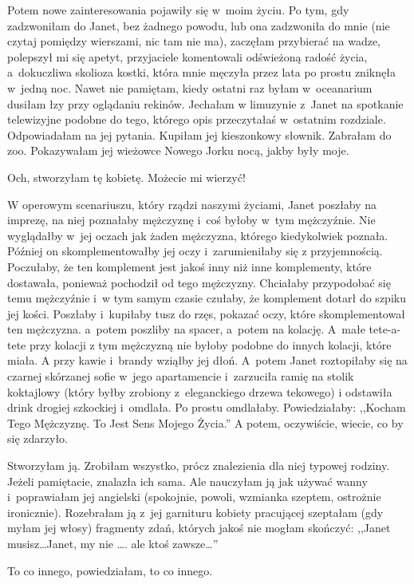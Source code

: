 \documentclass[oneside,polish,12pt,sfheadings]{mwbk}
\begin{document}
Potem nowe zainteresowania pojawiły się w~moim życiu. Po tym, gdy
zadzwoniłam do Janet, bez żadnego powodu, lub ona zadzwoniła do mnie
(nie czytaj pomiędzy wierszami, nic tam nie ma), zaczęłam przybierać
na wadze, polepszył mi się apetyt, przyjaciele komentowali odświeżoną
radość życia, a~dokuczliwa skolioza kostki, która mnie męczyła przez
lata po prostu zniknęła w~jedną noc. Nawet nie pamiętam, kiedy ostatni
raz byłam w~oceanarium dusiłam łzy przy oglądaniu rekinów. Jechałam
w limuzynie z~Janet na spotkanie telewizyjne podobne do tego, którego
opis przeczytałaś w~ostatnim rozdziale. Odpowiadałam na jej pytania.
Kupiłam jej kieszonkowy słownik. Zabrałam do zoo. Pokazywałam jej
wieżowce Nowego Jorku nocą, jakby były moje.

Och, stworzyłam tę kobietę. Możecie mi wierzyć!

W operowym scenariuszu, który rządzi naszymi życiami, Janet poszłaby
na imprezę, na niej poznałaby mężczyznę i~coś byłoby w~tym mężczyźnie.
Nie wyglądałby w~jej oczach jak żaden mężczyzna, którego kiedykolwiek
poznała. Później on skomplementowałby jej oczy i~zarumieniłaby się
z przyjemnością. Poczułaby, że ten komplement jest jakoś inny niż
inne komplementy, które dostawała, ponieważ pochodził od tego mężczyzny.
Chciałaby przypodobać się temu mężczyźnie i~w tym samym czasie czułaby,
że komplement dotarł do szpiku jej kości. Poszłaby i~kupiłaby tusz
do rzęs, pokazać oczy, które skomplementował ten mężczyzna. a~potem
poszliby na spacer, a~potem na kolację. A~małe tete-a-tete przy kolacji
z tym mężczyzną nie byłoby podobne do innych kolacji, które miała.
A przy kawie i~brandy wziąłby jej dłoń. A~potem Janet roztopiłaby
się na czarnej skórzanej sofie w~jego apartamencie i~zarzuciła ramię
na stolik koktajlowy (który byłby zrobiony z~eleganckiego drzewa tekowego)
i odstawiła drink drogiej szkockiej i~omdlała. Po prostu omdlałaby.
Powiedziałaby: ,,Kocham Tego Mężczyznę. To Jest Sens Mojego Życia.''
A potem, oczywiście, wiecie, co by się zdarzyło.

Stworzyłam ją. Zrobiłam wszystko, prócz znalezienia dla niej typowej
rodziny. Jeżeli pamiętacie, znalazła ich sama. Ale nauczyłam ją jak
używać wanny i~poprawiałam jej angielski (spokojnie, powoli, wzmianka
szeptem, ostrożnie ironicznie). Rozebrałam ją z~jej garnituru
kobiety pracującej szeptałam (gdy myłam jej włosy) fragmenty zdań,
których jakoś nie mogłam skończyć: ,,Janet musisz\ldots Janet, my nie
\ldots. ale ktoś zawsze\ldots''

To co innego, powiedziałam, to co innego.
\end{document}
